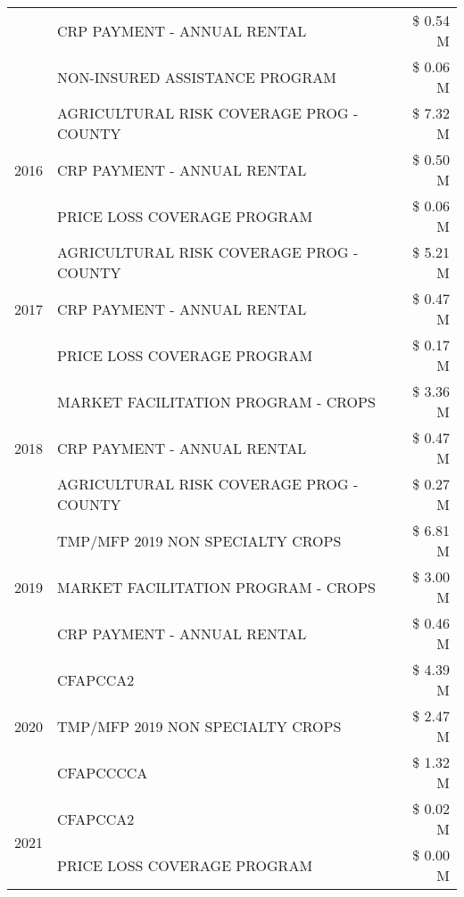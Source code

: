 \begin{tabular}{llr}
 & CRP PAYMENT - ANNUAL RENTAL & \$ 0.54 M \\
 & NON-INSURED ASSISTANCE PROGRAM & \$ 0.06 M \\
\cline{1-3}
\multirow[t]{3}{*}{2016} & AGRICULTURAL RISK COVERAGE PROG - COUNTY & \$ 7.32 M \\
 & CRP PAYMENT - ANNUAL RENTAL & \$ 0.50 M \\
 & PRICE LOSS COVERAGE PROGRAM & \$ 0.06 M \\
\cline{1-3}
\multirow[t]{3}{*}{2017} & AGRICULTURAL RISK COVERAGE PROG - COUNTY & \$ 5.21 M \\
 & CRP PAYMENT - ANNUAL RENTAL & \$ 0.47 M \\
 & PRICE LOSS COVERAGE PROGRAM & \$ 0.17 M \\
\cline{1-3}
\multirow[t]{3}{*}{2018} & MARKET FACILITATION PROGRAM - CROPS & \$ 3.36 M \\
 & CRP PAYMENT - ANNUAL RENTAL & \$ 0.47 M \\
 & AGRICULTURAL RISK COVERAGE PROG - COUNTY & \$ 0.27 M \\
\cline{1-3}
\multirow[t]{3}{*}{2019} & TMP/MFP 2019 NON SPECIALTY CROPS & \$ 6.81 M \\
 & MARKET FACILITATION PROGRAM - CROPS & \$ 3.00 M \\
 & CRP PAYMENT - ANNUAL RENTAL & \$ 0.46 M \\
\cline{1-3}
\multirow[t]{3}{*}{2020} & CFAPCCA2 & \$ 4.39 M \\
 & TMP/MFP 2019 NON SPECIALTY CROPS & \$ 2.47 M \\
 & CFAPCCCCA & \$ 1.32 M \\
\cline{1-3}
\multirow[t]{2}{*}{2021} & CFAPCCA2 & \$ 0.02 M \\
 & PRICE LOSS COVERAGE PROGRAM & \$ 0.00 M \\
\cline{1-3}
\bottomrule
\end{tabular}

